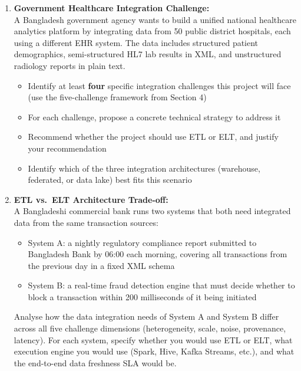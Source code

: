 \documentclass[12pt,a4paper]{article}
\begin{document}
\begin{enumerate}[label=\textbf{A\arabic*.}, leftmargin=2.5em, itemsep=8pt]
  \item \textbf{Government Healthcare Integration Challenge:}\\
  A Bangladesh government agency wants to build a unified national healthcare analytics platform by integrating data from 50 public district hospitals, each using a different EHR system.  The data includes structured patient demographics, semi-structured HL7 lab results in XML, and unstructured radiology reports in plain text.
  \begin{itemize}[leftmargin=1.5em]
    \item Identify at least \textbf{four} specific integration challenges this project will face (use the five-challenge framework from Section 4)
    \item For each challenge, propose a concrete technical strategy to address it
    \item Recommend whether the project should use ETL or ELT, and justify your recommendation
    \item Identify which of the three integration architectures (warehouse, federated, or data lake) best fits this scenario
  \end{itemize}

  \item \textbf{ETL vs.\ ELT Architecture Trade-off:}\\
  A Bangladeshi commercial bank runs two systems that both need integrated data from the same transaction sources:
  \begin{itemize}[leftmargin=1.5em]
    \item System A: a nightly regulatory compliance report submitted to Bangladesh Bank by 06:00 each morning, covering all transactions from the previous day in a fixed XML schema
    \item System B: a real-time fraud detection engine that must decide whether to block a transaction within 200 milliseconds of it being initiated
  \end{itemize}
  Analyse how the data integration needs of System A and System B differ across all five challenge dimensions (heterogeneity, scale, noise, provenance, latency).  For each system, specify whether you would use ETL or ELT, what execution engine you would use (Spark, Hive, Kafka Streams, etc.), and what the end-to-end data freshness SLA would be.
\end{enumerate}
\end{document}

